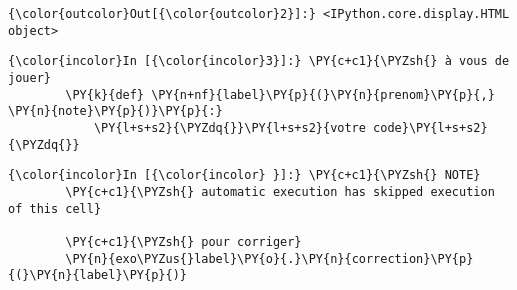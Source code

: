 \begin{Verbatim}[commandchars=\\\{\}]
{\color{outcolor}Out[{\color{outcolor}2}]:} <IPython.core.display.HTML object>
\end{Verbatim}
            
    \begin{Verbatim}[commandchars=\\\{\}]
{\color{incolor}In [{\color{incolor}3}]:} \PY{c+c1}{\PYZsh{} à vous de jouer}
        \PY{k}{def} \PY{n+nf}{label}\PY{p}{(}\PY{n}{prenom}\PY{p}{,} \PY{n}{note}\PY{p}{)}\PY{p}{:}
            \PY{l+s+s2}{\PYZdq{}}\PY{l+s+s2}{votre code}\PY{l+s+s2}{\PYZdq{}}
\end{Verbatim}


    \begin{Verbatim}[commandchars=\\\{\}]
{\color{incolor}In [{\color{incolor} }]:} \PY{c+c1}{\PYZsh{} NOTE}
        \PY{c+c1}{\PYZsh{} automatic execution has skipped execution of this cell}
        
        \PY{c+c1}{\PYZsh{} pour corriger}
        \PY{n}{exo\PYZus{}label}\PY{o}{.}\PY{n}{correction}\PY{p}{(}\PY{n}{label}\PY{p}{)}
\end{Verbatim}



    
    
    
